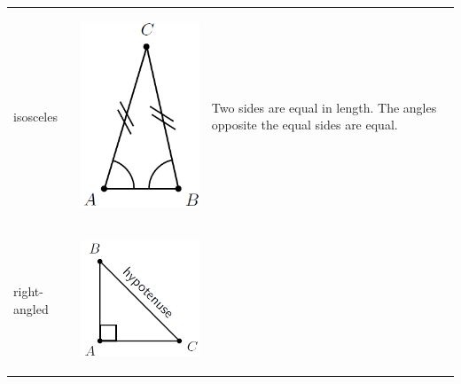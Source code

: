 \begin{center}
\begin{xtabular*}{\mytablewidth}[t]{|p{10\mystarwidth}|p{10\mystarwidth}|p{10\mystarwidth}|}
     \tabularnewline{}
        isosceles &
    \setcounter{subfigure}{0}
\label{m39368*id317593}
    \begin{center}
    \label{m39368*id317593!!!underscore!!!media}\label{m39368*id317593!!!underscore!!!printimage}\includegraphics[width=.2\columnwidth]{col11306.imgs/m39368_MG10C13_024.png} %
      \vspace{2pt}
    \vspace{.1in}
    \end{center}    
                 &
        Two sides are equal in length. The angles opposite the equal sides are equal.%
     \tabularnewline{}
        right-angled &
    \setcounter{subfigure}{0}
\label{m39368*id317628}
    \begin{center}
    \label{m39368*id317628!!!underscore!!!media}\label{m39368*id317628!!!underscore!!!printimage}\includegraphics[width=.2\columnwidth]{col11306.imgs/m39368_MG10C13_025.png} %

\end{center}
\end{xtabular*}
\end{center}
